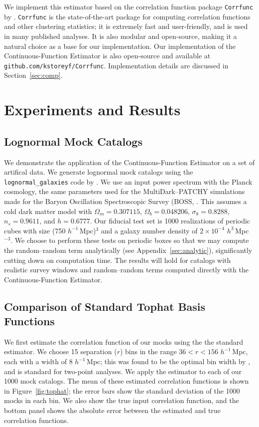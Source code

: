 \documentclass[modern]{aastex62}
\newcommand{\est}{the Continuous-Function Estimator\xspace}
\newcommand{\hmpc}{$h^{-1}\,$Mpc}
\begin{document}
We implement this estimator based on the correlation function package \texttt{Corrfunc} by \cite{Sinha2019}.
\texttt{Corrfunc} is the state-of-the-art package for computing correlation functions and other clustering statistics; it is extremely fast and user-friendly, and is used in many published analyses.
It is also modular and open-source, making it a natural choice as a base for our implementation.
Our implementation of \est is also open-source and available at \texttt{github.com/kstoreyf/Corrfunc}.
Implementation details are discussed in Section~\ref{sec:comp}.


\section{Experiments and Results}
\label{sec:experiments}

\subsection{Lognormal Mock Catalogs}

We demonstrate the application of \est on a set of artifical data.
We generate lognormal mock catalogs \citep{ColesJones1991} using the \texttt{lognormal\_galaxies} code by \citep{Agrawal2017}.
We use an input power spectrum with the Planck cosmology, the same parameters used for the MultiDark--PATCHY simulations \citep{Kitaura2016} made for the Baryon Oscillation Spectroscopic Survey (BOSS, \citealt{Dawson2013}.
This assumes a cold dark matter model with $\Omega_m = 0.307115$, $\Omega_b = 0.048206$, $\sigma_8 = 0.8288$, $n_s = 0.9611$, and $h = 0.6777$.
Our fiducial test set is 1000 realizations of periodic cubes with size (750 \hmpc)$^3$ and a galaxy number density of $2 \times 10^{-4}$ $h^{3}\,$Mpc$^{-3}$.
We choose to perform these tests on periodic boxes so that we may compute the random--random term analytically (see Appendix~\ref{sec:analytic}), significantly cutting down on computation time.
The results will hold for catalogs with realistic survey windows and random--random terms computed directly with \est.

\subsection{Comparison of Standard Tophat Basis Functions}

We first estimate the correlation function of our mocks using the the standard estimator.
We choose 15 separation ($r$) bins in the range $36 < r < 156$ \hmpc, each with a width of 8 \hmpc; this was found to be the optimal bin width by \cite{Percival2014}, and is standard for two-point analyses.
We apply the estimator to each of our 1000 mock catalogs.
The mean of these estimated correlation functions is shown in Figure~\ref{fig:tophat}; the error bars show the standard deviation of the 1000 mocks in each bin.
We also show the true input correlation function, and the bottom panel shows the absolute error between the estimated and true correlation functions.
\end{document}

